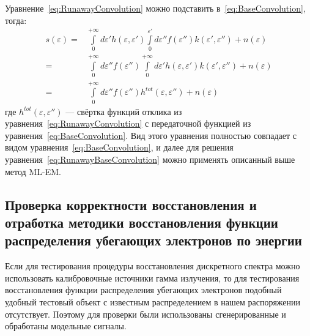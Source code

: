 Уравнение~\ref{eq:RunawayConvolution} можно подставить в~\ref{eq:BaseConvolution}, тогда:
\begin{equation}
  \label{eq:RunawayBaseConvolution}
  \begin{alignedat}{1}
    s( \varepsilon ) = & \int \limits_0^{+\infty} d \varepsilon' h( \varepsilon, \varepsilon' ) \int \limits_0^{\varepsilon'} d \varepsilon'' f( \varepsilon'') k( \varepsilon', \varepsilon'' ) + n(\varepsilon) \\
    = & \int \limits_0^{+\infty} d \varepsilon'' f( \varepsilon'' ) \int \limits_0^{+\infty} d \varepsilon' h( \varepsilon, \varepsilon' ) k( \varepsilon', \varepsilon'' ) + n(\varepsilon) \\ 
    = & \int \limits_0^{+\infty} d \varepsilon'' f( \varepsilon'' ) h^{tot}( \varepsilon, \varepsilon'' ) + n(\varepsilon)
  \end{alignedat}  
\end{equation}
где $h^{tot}( \varepsilon, \varepsilon'' )$ --- свёртка функций отклика из уравнения~\ref{eq:RunawayConvolution} с передаточной функцией из уравнения~\ref{eq:BaseConvolution}. Вид этого уравнения полностью совпадает с видом уравнения~\ref{eq:BaseConvolution}, и далее для решения уравнения~\ref{eq:RunawayBaseConvolution} можно применять описанный выше метод ML-EM.~\cite{Shevelev2013}


\subsection{ Проверка корректности восстановления и отработка методики восстановления функции распределения убегающих электронов по энергии }

Если для тестирования процедуры восстановления дискретного спектра можно использовать калибровочные источники гамма излучения, то для тестирования восстановления функции распределения убегающих электронов подобный удобный тестовый объект с известным распределением в нашем распоряжении отсутствует. Поэтому для проверки были использованы сгенерированные и обработаны модельные сигналы.

